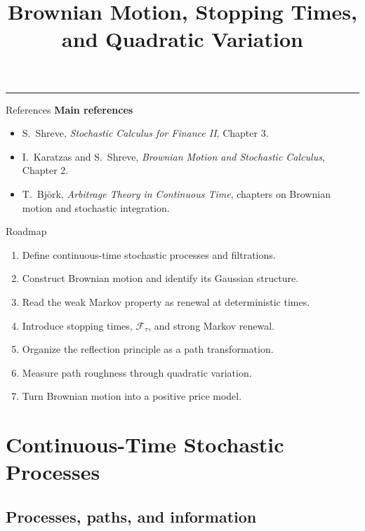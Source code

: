\documentclass[handout,10pt,aspectratio=169]{beamer}
\title{Brownian Motion, Stopping Times, and Quadratic Variation}
\author{}
\date{}
\newcommand{\F}{\mathcal F}
\begin{document}
\begin{frame}[plain]
  \vfill
  {\inserttitle\par}
  \medskip
  {\color{BootcampBlueDark}\rule{0.95\textwidth}{0.8pt}}
  \vfill
\end{frame}

\begin{frame}{References}
\footnotesize
\textbf{Main references}
\begin{itemize}\setlength{\itemsep}{0.5em}
  \item S.~Shreve, \emph{Stochastic Calculus for Finance II}, Chapter 3.
  \item I.~Karatzas and S.~Shreve, \emph{Brownian Motion and Stochastic Calculus}, Chapter 2.
  \item T.~Bj\"ork, \emph{Arbitrage Theory in Continuous Time}, chapters on Brownian motion and stochastic integration.
\end{itemize}
\end{frame}

\begin{frame}{Roadmap}
\begin{enumerate}\setlength{\itemsep}{0.45em}
  \item Define continuous-time stochastic processes and filtrations.
  \item Construct Brownian motion and identify its Gaussian structure.
  \item Read the weak Markov property as renewal at deterministic times.
  \item Introduce stopping times, \(\F_\tau\), and strong Markov renewal.
  \item Organize the reflection principle as a path transformation.
  \item Measure path roughness through quadratic variation.
  \item Turn Brownian motion into a positive price model.
\end{enumerate}
\end{frame}

\section{Continuous-Time Stochastic Processes}
\subsection{Processes, paths, and information}
\end{document}
